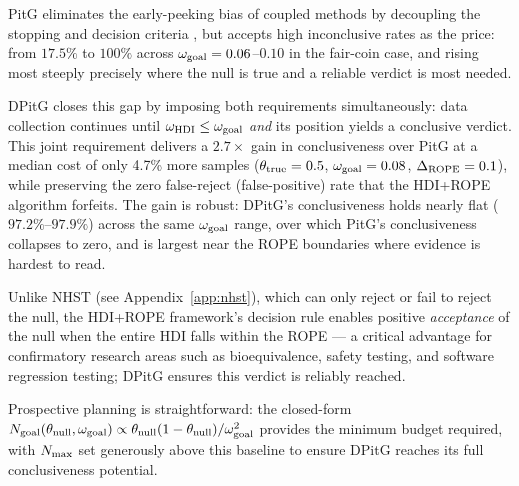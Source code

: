 
PitG eliminates the early-peeking bias of coupled methods by decoupling the stopping
and decision criteria \citep{kruschke2015doing}, but accepts high inconclusive rates
as the price: from $17.5\%$ to $100\%$ across $\omega_{\rm goal}=0.06$--$0.10$ in
the fair-coin case, and rising most steeply precisely where the null is true and a
reliable verdict is most needed.

DPitG closes this gap by imposing both requirements simultaneously: data collection
continues until $\omega_{\rm HDI} \le \omega_{\rm goal}$ \textit{and} its
position yields a conclusive verdict.
This joint requirement delivers a $2.7\times$ gain in conclusiveness over PitG at a
median cost of only 4.7\% more samples ($\theta_{\rm true}=0.5$, $\omega_{\rm goal}=0.08$,
$\Delta_{\rm ROPE}=0.1$), while preserving the zero false-reject (false-positive) rate that the HDI+ROPE algorithm
forfeits.
The gain is robust: DPitG's conclusiveness holds nearly flat ($97.2\%$--$97.9\%$)
across the same $\omega_{\rm goal}$ range, over which PitG's conclusiveness
collapses to zero, and is largest near the ROPE boundaries where evidence is
hardest to read.

Unlike NHST (see Appendix~\ref{app:nhst}), which can only reject or fail to reject
the null, the HDI+ROPE framework's decision rule enables positive \textit{acceptance} of the null
when the entire HDI falls within the ROPE --- a critical advantage for confirmatory
research areas such as bioequivalence, safety testing, and software regression testing;
DPitG ensures this verdict is reliably reached.

Prospective planning is straightforward: the closed-form
$N_{\rm goal}(\theta_{\rm null}, \omega_{\rm goal}) \propto
\theta_{\rm null}(1-\theta_{\rm null})/\omega_{\rm goal}^2$
provides the minimum budget required, with $N_{\rm max}$ set generously above this
baseline to ensure DPitG reaches its full conclusiveness potential.

